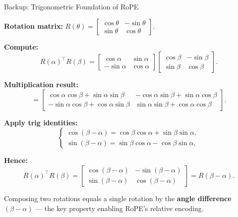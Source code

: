 \documentclass[aspectratio=169,xcolor=dvipsnames]{beamer}
\begin{document}
\begin{frame}{Backup: Trigonometric Foundation of RoPE}
\footnotesize

\textbf{Rotation matrix:} 
\(
R(\theta)=
\begin{bmatrix}
\cos\theta & -\sin\theta\\
\sin\theta & \cos\theta
\end{bmatrix}.
\)

\vspace{1mm}
\textbf{Compute:}
\[
R(\alpha)^\top R(\beta)
=
\begin{bmatrix}
\cos\alpha & \sin\alpha\\[-2pt]
-\sin\alpha & \cos\alpha
\end{bmatrix}
\!\!
\begin{bmatrix}
\cos\beta & -\sin\beta\\[-2pt]
\sin\beta & \cos\beta
\end{bmatrix}.
\]

\vspace{1mm}
\textbf{Multiplication result:}
\[
\!\!=
\begin{bmatrix}
\cos\alpha\cos\beta+\sin\alpha\sin\beta &
-\cos\alpha\sin\beta+\sin\alpha\cos\beta\\[-1pt]
-\sin\alpha\cos\beta+\cos\alpha\sin\beta &
\sin\alpha\sin\beta+\cos\alpha\cos\beta
\end{bmatrix}.
\]

\vspace{1mm}
\textbf{Apply trig identities:}
\[
\begin{cases}
\cos(\beta-\alpha)=\cos\beta\cos\alpha+\sin\beta\sin\alpha,\\[-2pt]
\sin(\beta-\alpha)=\sin\beta\cos\alpha-\cos\beta\sin\alpha,
\end{cases}
\]

\vspace{1mm}
\textbf{Hence:}
\[
R(\alpha)^\top R(\beta)
=
\begin{bmatrix}
\cos(\beta-\alpha) & -\sin(\beta-\alpha)\\[-1pt]
\sin(\beta-\alpha) & \cos(\beta-\alpha)
\end{bmatrix}
=R(\beta-\alpha).
\]

\vspace{1mm}
Composing two rotations equals a single rotation 
by the \textbf{angle difference} $(\beta-\alpha)$ — 
the key property enabling RoPE’s relative encoding.
\end{frame}
\end{document}
